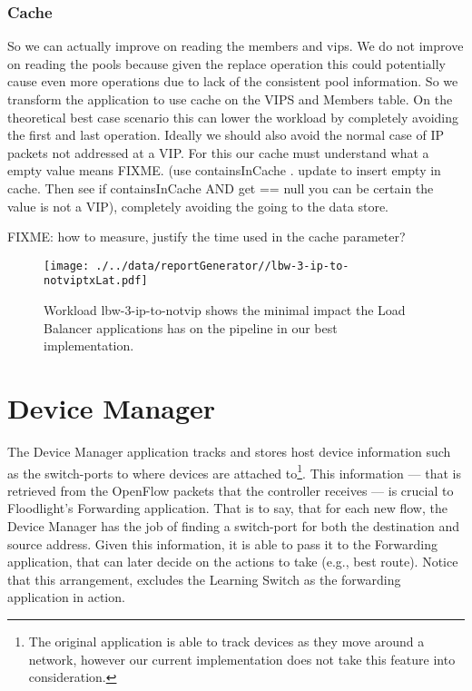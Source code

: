 \documentclass[12pt,openright,twoside]{report}
\begin{document}
\subsubsection{Cache}
So we can actually improve on reading the members and vips.  We do not
improve on reading the pools because given the replace operation this
could potentially cause even more operations due to lack of the
consistent pool information. So we transform the application to use
cache on the VIPS and Members  table. On the theoretical best case scenario this
can lower the workload by completely avoiding the first and last
operation. Ideally we should also avoid the normal case of IP packets
not addressed at a VIP. For this our cache  must understand what a
empty value means FIXME. (use containsInCache . update to insert empty
in cache. Then see if containsInCache AND get == null you can be
certain the value is not a VIP), completely avoiding the going to the
data store. 

FIXME: how to measure, justify the time used in the cache parameter? 

\begin{figure}[ht]
\centering
\texttt{[image: ./../data/reportGenerator//lbw-3-ip-to-notviptxLat.pdf]}
\caption[Minimum impact of Load Balancer in the pipeline.]{Workload
  lbw-3-ip-to-notvip shows the minimal impact the Load Balancer
  applications has on the pipeline in our best implementation.}
\end{figure}


\section{Device Manager}
\label{sec:feasibility:dm}
\glsresetall

The Device Manager application tracks  and stores host device
information such as the switch-ports to where devices are
attached to\footnote{The original application is able to track devices as
  they move around a network, however our current implementation does
  not take this feature into consideration.}. This information ---
that is retrieved from the OpenFlow packets that the controller receives --- is crucial to
Floodlight’s Forwarding application. That is to say, that for  each new flow, the Device
Manager has the job of finding a switch-port for both the destination
and source address. Given this information, it is able to pass it to
the Forwarding application, that can later decide on the actions to
take (e.g., best route). Notice that this arrangement, excludes the
Learning Switch as the  forwarding application in action. 
\end{document}
